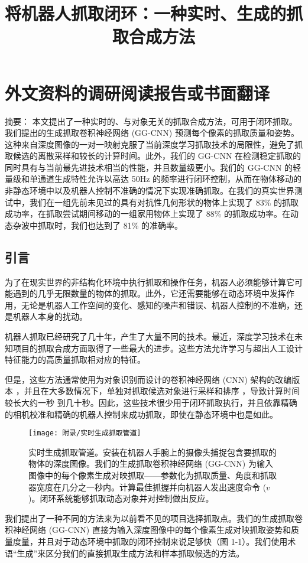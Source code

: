 \chapter{外文资料的调研阅读报告或书面翻译}

\title{将机器人抓取闭环：一种实时、生成的抓取合成方法}

{\heiti 摘要：} 本文提出了一种实时的、与对象无关的抓取合成方法，可用于闭环抓取。我们提出的生成抓取卷积神经网络 (GG-CNN) 预测每个像素的抓取质量和姿势。这种来自深度图像的一对一映射克服了当前深度学习抓取技术的局限性，避免了抓取候选的离散采样和较长的计算时间。此外，我们的 GG-CNN 在检测稳定抓取的同时具有与当前最先进技术相当的性能，并且数量级更小。我们的 GG-CNN 的轻量级和单通道生成特性允许以高达 50Hz 的频率进行闭环控制，从而在物体移动的非静态环境中以及机器人控制不准确的情况下实现准确抓取。在我们的真实世界测试中，我们在一组先前未见过的具有对抗性几何形状的物体上实现了 83\% 的抓取成功率，在抓取尝试期间移动的一组家用物体上实现了 88\% 的抓取成功率。在动态杂波中抓取时，我们也达到了 81\% 的准确率。

\section{引言}
为了在现实世界的非结构化环境中执行抓取和操作任务，机器人必须能够计算它可能遇到的几乎无限数量的物体的抓取。此外，它还需要能够在动态环境中发挥作用，无论是机器人工作空间的变化、感知的噪声和错误、机器人控制的不准确，还是机器人本身的扰动。


机器人抓取已经研究了几十年，产生了大量不同的技术。最近，深度学习技术在未知项目的抓取合成方面取得了一些最大的进步。这些方法允许学习与超出人工设计特征能力的高质量抓取相对应的特征。


但是，这些方法通常使用为对象识别而设计的卷积神经网络 (CNN) 架构的改编版本 ，并且在大多数情况下，单独对抓取候选对象进行采样和排序 ，导致计算时间较长大约一秒 到几十秒。因此，这些技术很少用于闭环抓取执行，并且依靠精确的相机校准和精确的机器人控制来成功抓取，即使在静态环境中也是如此。
\begin{figure}[h]
	\centering
	\texttt{[image: 附录/实时生成抓取管道]}
	\caption{实时生成抓取管道。安装在机器人手腕上的摄像头捕捉包含要抓取的物体的深度图像。我们的生成抓取卷积神经网络 (GG-CNN) 为输入图像中的每个像素生成对映抓取——参数化为抓取质量、角度和抓取器宽度在几分之一秒内。计算最佳抓握并向机器人发出速度命令 ($v$)。闭环系统能够抓取动态对象并对控制做出反应。}
	\label{实时生成抓取管道}
\end{figure}


我们提出了一种不同的方法来为以前看不见的项目选择抓取点。我们的生成抓取卷积神经网络 (GG-CNN) 直接为输入深度图像中的每个像素生成对映抓取姿势和质量度量，并且对于动态环境中抓取的闭环控制来说足够快（图 1-1）。我们使用术语“生成”来区分我们的直接抓取生成方法和样本抓取候选的方法。



